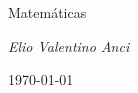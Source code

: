 \documentclass[a5paper]{book}
\begin{document}
  \begin{titlepage}
    \centering
    \vspace*{\fill}
    {\Huge \ttfamily Matemáticas \par}
    \vspace*{\fill}
    {\large \itshape Elio Valentino Anci \par}
    {\small\today\par}
  \end{titlepage} 
  \tableofcontents

  
  
  

  
\end{document}
